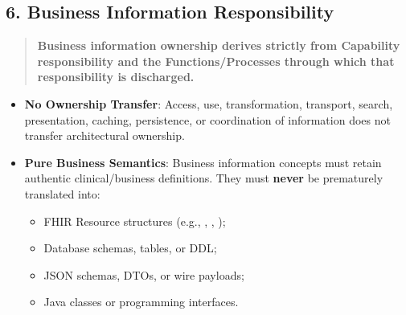 \par\smallskip
{}\label{rad:metamodel:257}
\subsection*{6. Business Information Responsibility}
\label{rad:metamodel:259}

\begin{quote}

\textbf{Business information ownership derives strictly from Capability responsibility and the Functions/\allowbreak{}Processes through which that responsibility is discharged.}


\end{quote}
\label{rad:metamodel:261}

\begin{itemize}

\item
\textbf{No Ownership Transfer}: Access, use, transformation, transport, search, presentation, caching, persistence, or coordination of information does not transfer architectural ownership.



\item
\textbf{Pure Business Semantics}: Business information concepts must retain authentic clinical/\allowbreak{}business definitions. They must \textbf{never} be prematurely translated into:


\begin{itemize}

\item
FHIR Resource structures (e.g., \texttt{}, \texttt{}, \texttt{});



\item
Database schemas, tables, or DDL;



\item
JSON schemas, DTOs, or wire payloads;



\item
Java classes or programming interfaces.



\end{itemize}


\end{itemize}
\label{rad:metamodel:268}

